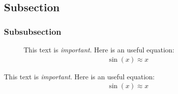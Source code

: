 \lipsum[1-30]
\subsection{Subsection}
\begin{figure}
\begin{BStkyNote}
\lipsum[1]
\end{BStkyNote}
\end{figure}
\lipsum[1-10]
\subsubsection{Subsubsection}
\begin{figure}
\begin{WStkyNote}

This text is \emph{important}. Here is an useful equation:
\begin{align}
    \sin (x) \approx x
\end{align}
\end{WStkyNote}
\end{figure}
\lipsum[1-20]

\begin{FullStkyNote}

This text is \emph{important}. Here is an useful equation:
\begin{align}
    \sin (x) \approx x
\end{align}
\end{FullStkyNote}


%
%


